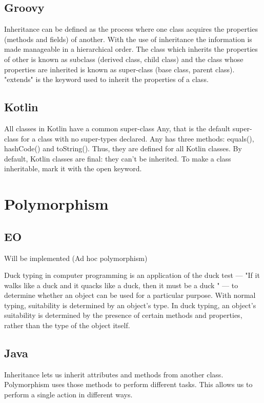 \documentclass[12pt]{book}
\begin{document}
\subsection{Groovy}
Inheritance can be defined as the process where one class acquires the properties (methods and fields) of another. With the use of inheritance the information is made 
manageable in a hierarchical order. The class which inherits the properties of other is known as subclass (derived class, child class) and the class whose  properties are inherited is known as super-class (base class, parent class). "extends" is the keyword used to inherit the properties of a class.

\subsection{Kotlin}
All classes in Kotlin have a common super-class Any, that is the default super-class for a class with no super-types declared. Any has three methods: equals(), hashCode() and toString(). Thus, they are defined for all Kotlin classes. By default, Kotlin classes are final: they can’t be inherited. To make a class inheritable, mark it with the open keyword.

\section{Polymorphism}

\subsection{EO}
Will be implemented (Ad hoc polymorphism)

Duck typing in computer programming is an application of the duck test —
"If it walks like a duck and it quacks like a duck, then it must be a duck
" — to determine whether 
an object can be used for a particular purpose. 
With normal typing, suitability is determined by an object's type.
 In duck typing, an object's suitability is determined by the presence 
of certain methods and properties, rather than the type of the object itself.

\subsection{Java}
Inheritance lets us inherit attributes and methods from another class.
 Polymorphism uses those methods to perform different tasks. 
This allows us to perform a single action in different ways.
 
\end{document}
